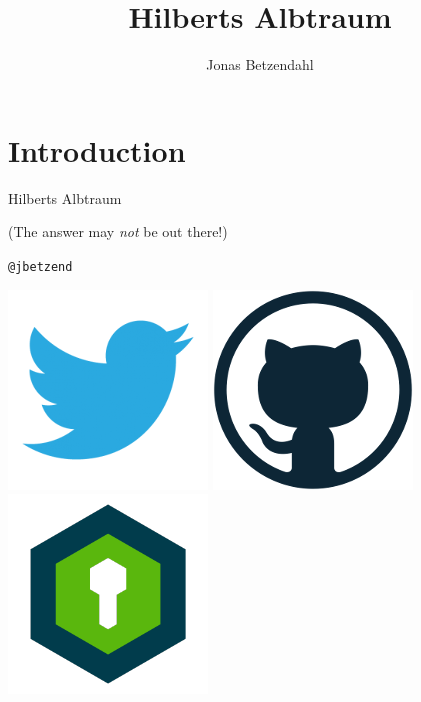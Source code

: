 \documentclass[aspectratio=43]{beamer}
\author{Jonas Betzendahl}
\title{Hilberts Albtraum}
\begin{document}
\section{Introduction}

\begin{frame}
\begin{center}
\Large \glqq Hilberts Albtraum\grqq
\normalsize 

(The answer may \textit{not} be out there!)
\bigskip\bigskip

\Large \texttt{@jbetzend}
\smallskip

\href{https://twitter.com/jbetzend}{\includegraphics[scale=0.125]{images/twitter_logo.png}}
\href{https://github.com/jbetzend}{\includegraphics[scale=0.125]{images/github_logo.png}}
\href{https://whispeer.de/en/user/jbetzend}{\includegraphics[scale=0.125]{images/whispeer_logo.png}}
\end{center}
\end{frame}
\end{document}
